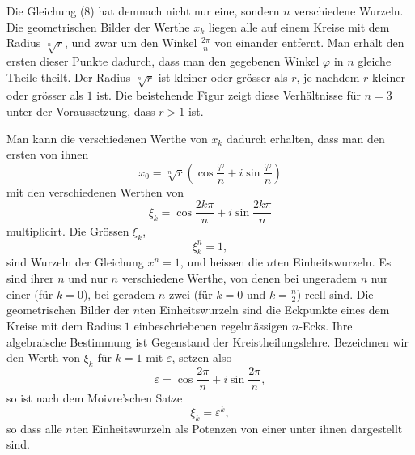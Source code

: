 \documentclass[11pt]{article}
\begin{document}
Die Gleichung (8) hat demnach nicht nur eine, sondern $n$ verschiedene Wurzeln. Die geometrischen Bilder der Werthe $x_k$ liegen alle auf einem Kreise mit dem Radius $\sqrt[n]{r}$, und zwar um den Winkel $\frac{2\pi}{n}$ von einander entfernt. Man erhält den ersten dieser Punkte dadurch, dass man den gegebenen Winkel $\varphi$ in $n$ gleiche Theile theilt. Der Radius $\sqrt[n]{r}$ ist kleiner oder grösser als $r$, je nachdem $r$ kleiner oder grösser als $1$ ist. Die beistehende Figur zeigt diese Verhältnisse für $n=3$ unter der Voraussetzung, dass $r>1$ ist.

Man kann die verschiedenen Werthe von $x_k$ dadurch erhalten, dass man den ersten von ihnen
\[
 x_0=\sqrt[n]{r}\left(\cos\frac{\varphi}{n}+i\sin\frac{\varphi}{n}\right)
\]
mit den verschiedenen Werthen von
\begin{equation}
 \xi_k=\cos\frac{2k\pi}{n}+i\sin\frac{2k\pi}{n}
\tag{11}
\end{equation}
multiplicirt. Die Grössen $\xi_k$,
\begin{equation}
 \xi_k^n=1,
\tag{12}
\end{equation}
sind Wurzeln der Gleichung $x^n=1$, und heissen die $n$ten Einheitswurzeln. Es sind ihrer $n$ und nur $n$ verschiedene Werthe, von denen bei ungeradem $n$ nur einer (für $k=0$), bei geradem $n$ zwei (für $k=0$ und $k=\frac n2$) reell sind. Die geometrischen Bilder der $n$ten Einheitswurzeln sind die Eckpunkte eines dem Kreise mit dem Radius $1$ einbeschriebenen regelmässigen $n$-Ecks. Ihre algebraische Bestimmung ist Gegenstand der Kreistheilungslehre. Bezeichnen wir den Werth von $\xi_k$ für $k=1$ mit $\varepsilon$, setzen also
\[
 \varepsilon=\cos\frac{2\pi}{n}+i\sin\frac{2\pi}{n},
\]
so ist nach dem Moivre'schen Satze
\[
 \xi_k=\varepsilon^k,
\]
so dass alle $n$ten Einheitswurzeln als Potenzen von einer unter ihnen dargestellt sind.
\end{document}
